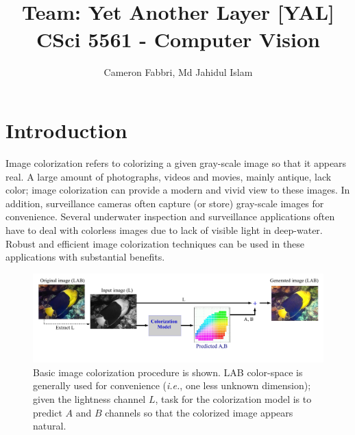 \documentclass[10pt]{article}
\title{\textbf{\doctitle}\\ \vspace{3mm}
\small {Team: Yet Another Layer [YAL]} \\
\small CSci 5561 - Computer Vision }
\author{Cameron Fabbri, Md Jahidul Islam}
\date{}
\begin{document}
\maketitle

\begin{abstract}



\end{abstract}

\section{Introduction}\label{sec:intro}
Image colorization \cite{zhang2016colorful, cheng2015deep, bugeau2014variational} refers to colorizing a given gray-scale image so that it appears real. 
A large amount of photographs, videos and movies, mainly antique, lack color; image colorization can provide a modern and vivid view to these images. In addition, surveillance cameras often capture (or store) gray-scale images for convenience. Several underwater inspection and surveillance applications \cite{lu2013underwater, torres2005color} often have to deal with colorless images due to lack of visible light in deep-water. Robust and efficient image colorization techniques can be used in these applications with substantial benefits.   

\begin{figure}[h]
\vspace{-3mm}
\centering
\includegraphics[width=\linewidth]{Figs/6.pdf}
\vspace{-13mm}
\caption{Basic image colorization procedure is shown. LAB color-space is generally used for convenience (\textit{i.e.}, one less unknown dimension); given the lightness channel $L$, task for the colorization model is to predict $A$ and $B$ channels so that the colorized image appears natural. }
\label{fig:col}
\end{figure}  
\end{document}
